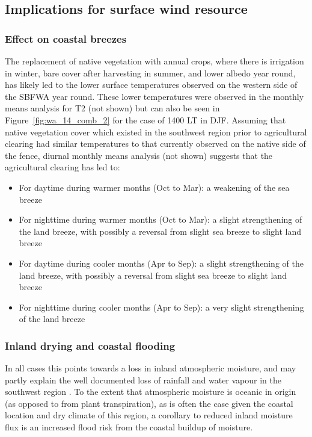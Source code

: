 \subsection{Implications for surface wind resource} 

\subsubsection{Effect on coastal breezes}

The replacement of native vegetation with annual crops, where there is irrigation in winter, bare cover after harvesting in summer, and lower albedo year round, has likely led to the lower surface temperatures observed on the western side of the \ac{SBFWA} year round. These lower temperatures were observed in the monthly means analysis for \ac{T2} (not shown) but can also be seen in Figure~\ref{fig:wa_14_comb_2} for the case of 1400 \ac{LT} in \ac{DJF}. Assuming that native vegetation cover which existed in the southwest region prior to agricultural clearing had similar temperatures to that currently observed on the native side of the fence, diurnal monthly means analysis (not shown) suggests that the agricultural clearing has led to:
\begin{itemize}
	\item For daytime during warmer months (Oct to Mar): a weakening of the sea breeze
	\item For nighttime during warmer months (Oct to Mar): a slight strengthening of the land breeze, with possibly a reversal from slight sea breeze to slight land breeze
	\item For daytime during cooler months (Apr to Sep): a slight strengthening of the land breeze, with possibly a reversal from slight sea breeze to slight land breeze
	\item For nighttime during cooler months (Apr to Sep): a very slight strengthening of the land breeze
\end{itemize}

\subsubsection{Inland drying and coastal flooding}

In all cases this points towards a loss in inland atmospheric moisture, and may partly explain the well documented loss of rainfall and water vapour in the southwest region \citep{gordon2003, narisma2003, pitman2004, junkermann2009}. To the extent that atmospheric moisture is oceanic in origin (as opposed to from plant transpiration), as is often the case given the coastal location and dry climate of this region, a corollary to reduced inland moisture flux is an increased flood risk from the coastal buildup of moisture.

